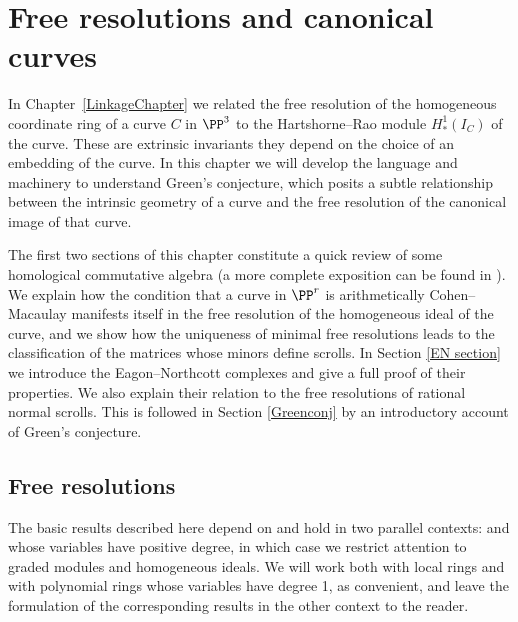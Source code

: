 

\chapter{Free resolutions and canonical curves}
\label{SyzygiesChapter}

\def\length{\mathrm{ length}}

In Chapter~\ref{LinkageChapter} we related the free resolution of the homogeneous
coordinate ring of a curve $C$
in $\PP^3$ to the Hartshorne--Rao module $H^{1}_{*}(I_{C})$ of the curve. These 
are extrinsic invariants \emdash they depend on the choice of an embedding of the curve.
 In this chapter we will develop the
language and machinery to understand Green's conjecture, which posits a
subtle relationship between the intrinsic geometry of a curve and the free resolution
of the canonical image of that curve.

The first two sections of this
chapter constitute a quick review of some
 homological commutative algebra (a
more complete exposition can be found in \cite[Part III]{Eisenbud1995}). We
  explain how the condition that a curve
in $\PP^r$ is arithmetically Cohen--Macaulay manifests itself in the
free resolution of the homogeneous ideal of the curve, and we show
how the uniqueness of minimal free resolutions leads to the
classification of the matrices whose minors define 
scrolls. In Section \ref{EN section} we
introduce the Eagon--Northcott complexes and give a full proof of their
properties. We also explain their relation to
the free resolutions of rational normal scrolls. This is followed in 
Section \ref{Greenconj} by an introductory account of Green's conjecture.

\section{Free resolutions}

The basic results described here depend on 
 and hold 
%
 in two parallel contexts:
%
%
and
%
%
whose variables have positive degree,  in which case we restrict attention
to graded modules and homogeneous ideals. 
We will work both with local rings and with
polynomial rings whose variables have degree 1,
as convenient, and leave the formulation of the corresponding results
in the other context to the reader.

